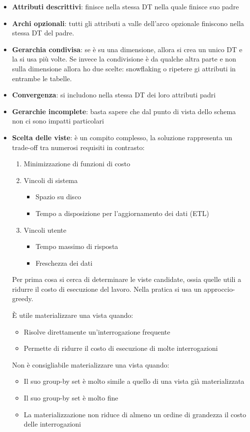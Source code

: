 \begin{itemize}
	\item 
	\textbf{Attributi descrittivi}: finisce nella stessa DT nella quale finisce suo padre
	\item
	\textbf{Archi opzionali}: tutti gli attributi a valle dell’arco opzionale finiscono nella stessa DT del padre.
	\item 
	\textbf{Gerarchia condivisa}: se è su una dimensione, allora si crea un unico DT e la si usa più volte. Se invece la condivisione è da qualche altra parte e non sulla dimensione allora ho due scelte: snowflaking o ripetere gi attributi in entrambe le tabelle. 
	\item 
	\textbf{Convergenza}: si includono nella stessa DT dei loro attributi padri
	\item 
	\textbf{Gerarchie incomplete}: basta sapere che dal punto di vista dello schema non ci sono impatti particolari
	\item 
	\textbf{Scelta delle viste}: è un compito complesso, la soluzione rappresenta un trade-off tra numerosi requisiti in contrasto: 
	\begin{enumerate}
		\item 
		Minimizzazione di funzioni di costo
		\item 
		Vincoli di sistema
		\begin{itemize}
			\item 
			Spazio su disco
			\item 
			Tempo a disposizione per l’aggiornamento dei dati (ETL)
		\end{itemize}
		\item 
		Vincoli utente
		\begin{itemize}
			\item
			Tempo massimo di risposta
			\item 
			Freschezza dei dati
		\end{itemize}
	\end{enumerate}
	Per prima cosa si cerca di determinare le viste candidate, ossia quelle utili a ridurre il costo di esecuzione del lavoro. Nella pratica si usa un approccio-greedy. 
	
	È utile materializzare una vista quando:
	\begin{itemize}
		\item
		Risolve direttamente un’interrogazione frequente
		\item 
		Permette di ridurre il costo di esecuzione di molte interrogazioni
	\end{itemize}
	Non è consigliabile materializzare una vista quando:
	\begin{itemize}
		\item
		Il suo group-by set è molto simile a quello di una vista già
		materializzata
		\item
		Il suo group-by set è molto fine
		\item 
		La materializzazione non riduce di almeno un ordine di grandezza il costo delle interrogazioni
	\end{itemize}
	
\end{itemize}

